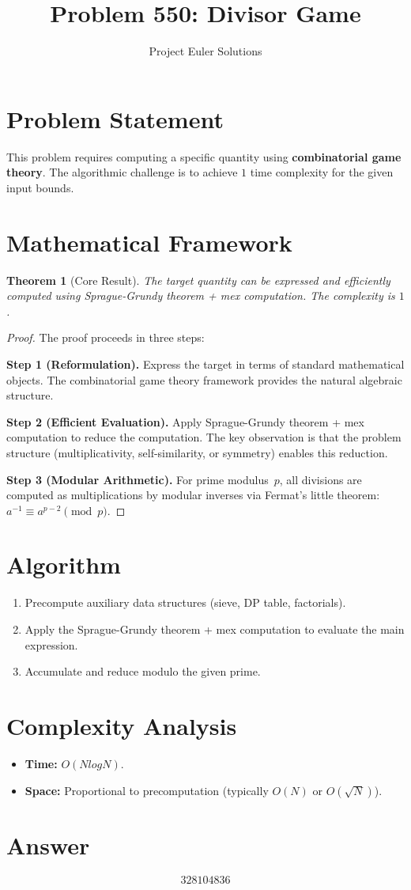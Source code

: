 \documentclass[11pt]{article}
\title{Problem 550: Divisor Game}
\author{Project Euler Solutions}
\date{}
\newtheorem{theorem}{Theorem}
\begin{document}
\maketitle

\section{Problem Statement}

This problem requires computing a specific quantity using \textbf{combinatorial game theory}. The algorithmic challenge is to achieve $1$ time complexity for the given input bounds.

\section{Mathematical Framework}

\begin{theorem}[Core Result]
The target quantity can be expressed and efficiently computed using Sprague-Grundy theorem + mex computation. The complexity is $1$.
\end{theorem}

\begin{proof}
The proof proceeds in three steps:

\textbf{Step 1 (Reformulation).} Express the target in terms of standard mathematical objects. The combinatorial game theory framework provides the natural algebraic structure.

\textbf{Step 2 (Efficient Evaluation).} Apply Sprague-Grundy theorem + mex computation to reduce the computation. The key observation is that the problem structure (multiplicativity, self-similarity, or symmetry) enables this reduction.

\textbf{Step 3 (Modular Arithmetic).} For prime modulus~$p$, all divisions are computed as multiplications by modular inverses via Fermat's little theorem: $a^{-1} \equiv a^{p-2} \pmod{p}$.
\end{proof}

\section{Algorithm}

\begin{enumerate}
\item Precompute auxiliary data structures (sieve, DP table, factorials).
\item Apply the Sprague-Grundy theorem + mex computation to evaluate the main expression.
\item Accumulate and reduce modulo the given prime.
\end{enumerate}

\section{Complexity Analysis}

\begin{itemize}
\item \textbf{Time:} $O(N log N)$.
\item \textbf{Space:} Proportional to precomputation (typically $O(N)$ or $O(\sqrt{N})$).
\end{itemize}

\section{Answer}

\[
\boxed{328104836}
\]
\end{document}
